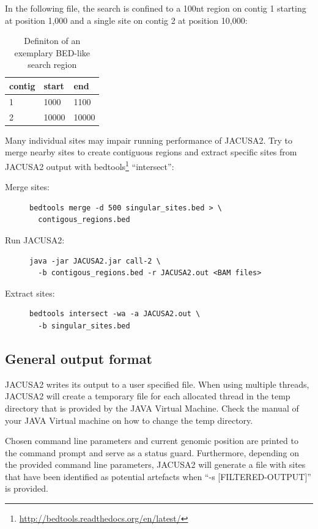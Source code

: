 \documentclass[10pt,a4paper,final]{article}
\begin{document}
In the following file, the search is confined to a 100nt region on contig 1 starting at position 
1,000 and a single site on contig 2 at position 10,000:
\begin{table}
\centering
  \caption{Definiton of an exemplary BED-like search region}
  \label{tbl:search_region}
  \begin{tabular}{lll}
    \textbf{contig} & \textbf{start} & \textbf{end} \\
    \hline
    1 & 1000 & 1100 \\
    2 & 10000 & 10000 \\
  \end{tabular}
\end{table}
Many individual sites may impair running performance of JACUSA2.
Try to merge nearby sites to create contiguous regions and extract specific sites from 
JACUSA2 output with bedtools\footnote{\url{http://bedtools.readthedocs.org/en/latest/}} ``intersect'':
\begin{description}
\item[Merge sites:] \begin{verbatim} 
bedtools merge -d 500 singular_sites.bed > \
  contigous_regions.bed
\end{verbatim}
\item[Run JACUSA2:] \begin{verbatim} 
java -jar JACUSA2.jar call-2 \
  -b contigous_regions.bed -r JACUSA2.out <BAM files>
\end{verbatim}
\item[Extract sites:] \begin{verbatim}
bedtools intersect -wa -a JACUSA2.out \
  -b singular_sites.bed
\end{verbatim}
\end{description}
\subsection{General output format}
JACUSA2 writes its output to a user specified file. When using multiple threads, JACUSA2 will
create a temporary file for each allocated thread in the temp directory that is provided by the 
JAVA Virtual Machine. Check the manual of your JAVA Virtual machine on how to change the temp directory. 

Chosen command line parameters and current genomic position are printed to the command prompt and
serve as a status guard. Furthermore, depending on the provided command line parameters, JACUSA2
will generate a file with sites that have been identified as potential artefacts when ``-s [FILTERED-OUTPUT]'' is 
provided.
\end{document}
